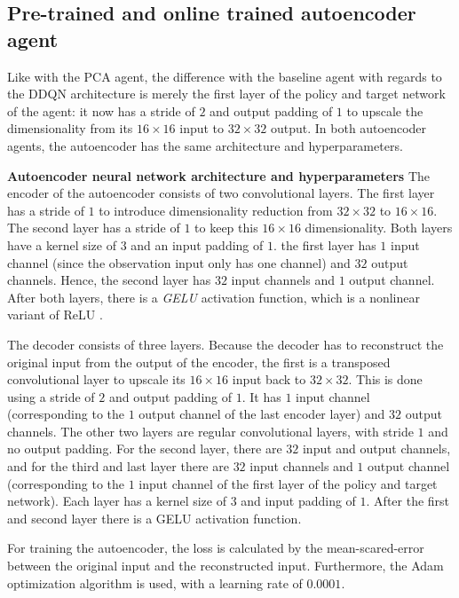 \subsection{Pre-trained and online trained autoencoder agent} %
Like with the PCA agent, the difference with the baseline agent with regards to the DDQN architecture is merely the first layer of the policy and target network of the agent: it now has a stride of $2$ and output padding of $1$ to upscale the dimensionality from its $16 \times 16$ input to $32 \times 32$ output. In both autoencoder agents, the autoencoder has the same architecture and hyperparameters. \newline

\noindent \textbf{Autoencoder neural network architecture and hyperparameters}
\noindent The encoder of the autoencoder consists of two convolutional layers. The first layer has a stride of $1$ to introduce dimensionality reduction from $32 \times 32$ to $16 \times 16$. The second layer has a stride of $1$ to keep this $16 \times 16$ dimensionality. Both layers have a kernel size of $3$ and an input padding of $1$. the first layer has $1$ input channel (since the observation input only has one channel) and $32$ output channels. Hence, the second layer has $32$ input channels and $1$ output channel. After both layers, there is a \emph{GELU} activation function, which is a nonlinear variant of ReLU \cite{gelu}.

The decoder consists of three layers. Because the decoder has to reconstruct the original input from the output of the encoder, the first is a transposed convolutional layer to upscale its $16 \times 16$ input back to $32 \times 32$. This is done using a stride of $2$ and output padding of $1$. It has $1$ input channel (corresponding to the $1$ output channel of the last encoder layer) and $32$ output channels. The other two layers are regular convolutional layers, with stride $1$ and no output padding. For the second layer, there are $32$ input and output channels, and for the third and last layer there are $32$ input channels and $1$ output channel (corresponding to the $1$ input channel of the first layer of the policy and target network). Each layer has a kernel size of $3$ and input padding of $1$. After the first and second layer there is a GELU activation function.

For training the autoencoder, the loss is calculated by the mean-scared-error between the original input and the reconstructed input. Furthermore, the Adam optimization algorithm is used, with a learning rate of $0.0001$. 


